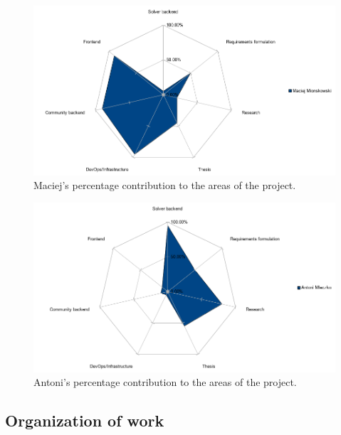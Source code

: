 \begin{figure}[H]
  \caption{Maciej's percentage contribution to the areas of the project.}
  \centering
  \includegraphics[width=\textwidth]{assets/4-percentage-maciej.png}
\end{figure}

\begin{figure}[H]
  \caption{Antoni's percentage contribution to the areas of the project.}
  \centering
  \includegraphics[width=\textwidth]{assets/4-percentage-antoni.png}
\end{figure}




\subsection{Organization of work}


